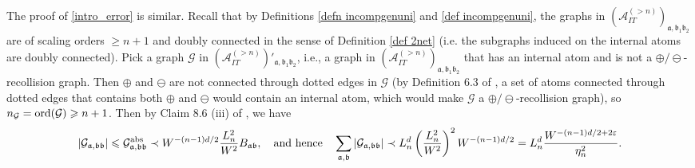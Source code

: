 \documentclass{article}
\newcommand{\1}{\mathds{1}}
\numberwithin{equation}{section}
\newcommand{\ord}{{\rm{ord}}}
\newcommand{\al}{\alpha}
\newcommand{\be}{\begin{equation}}
\newcommand{\ee}{\end{equation}}
\newcommand{\e}{{\varepsilon}}
\newcommand{\fa}{{\mathfrak a}}
\newcommand{\fb}{{\mathfrak b}}
\renewcommand{\cal}{\mathcal}
\renewcommand{\leq}{\leqslant}
\renewcommand{\geq}{\geqslant}
\renewcommand{\le}{\leq}
\renewcommand{\ge}{\geq}
\newcommand{\dashed}{\text{diffusive}}
\theoremstyle{plain} %
\theoremstyle{remark}
\newcommand{\cob}{\color{purple}}
\newcommand{\AITn}{{\mathcal A_{IT}^{(>n)}}}
\begin{document}
The proof of \eqref{intro_error} is similar. Recall that by Definitions \ref{defn incompgenuni} and \ref{def incompgenuni}, the graphs in $(\AITn)_{\fa,\fb_1\fb_2}$ are of scaling orders $\ge n+1$ and doubly connected in the sense of Definition \ref{def 2net} (i.e. the subgraphs induced on the internal atoms are doubly connected). %
Pick a graph $\cal G$ in $(\AITn)'_{\fa,\fb_1\fb_2}$, i.e., a graph in $(\AITn)_{\fa,\fb_1\fb_2}$ that has an internal atom and is not a $\oplus/\ominus$-recollision graph. Then $\oplus$ and $\ominus$ are not connected through dotted edges in $\cal G$ (by Definition 6.3 of \cite{PartII_high}, a set of atoms connected through dotted edges that contains both $\oplus$ and $\ominus$ would contain an internal atom, which would make $\cal G$ a $\oplus/\ominus$-recollision graph), so $n_{\cal G}=\ord(\cal G)\ge n+1$. Then by Claim 8.6 (iii) of \cite{PartII_high}, we have
$$|\cal G_{\fa,\fb\fb}|\le \cal G^{\rm abs}_{\fa,\fb\fb}\prec W^{-(n-1)d/2}\frac{L_n^2}{W^2}B_{\fa\fb},\quad\text{and hence}\quad \sum_{\fa,\fb}|\cal G_{\fa,\fb\fb}|\prec L_n^d\left(\frac{L_n^2}{W^2}\right)^2W^{-(n-1)d/2}=L_n^d \frac{W^{-(n-1)d/2+2\e}}{\eta_n^2}.$$
\end{document}
